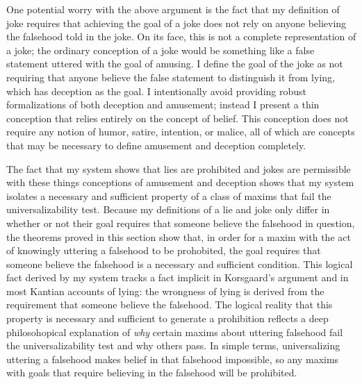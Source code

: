 \begin{isabellebody}
\endisatagproof
{\isafoldproof}%
%
\isadelimproof
%
\endisadelimproof
%
\begin{isamarkuptext}%
One potential worry with the above argument is the fact that my definition of joke requires that 
achieving the goal of a joke does not rely on anyone believing the falsehood told in the joke. On its face, 
this is not a complete representation of a joke; the ordinary conception of a joke would be something like 
a false statement uttered with the goal of amusing. I define the goal of the joke as not requiring that 
anyone believe the false statement to distinguish it from lying, which has deception as the goal. I 
intentionally avoid providing robust formalizations of both deception and amusement; instead I present a 
thin conception that relies entirely on the concept of belief. This conception does not require any notion
of humor, satire, intention, or malice, all of which are concepts that may be necessary to define 
amusement and deception completely. 

The fact that my system shows that lies are prohibited and jokes are permissible with these things 
conceptions of amusement and deception shows that my system isolates a necessary and sufficient property 
of a class of maxims that fail the universalizability test. Because my definitions of a lie and joke
only differ in whether or not their goal requires that someone believe the falsehood in question, the
theorems proved in this section show that, in order for a maxim with the act of knowingly uttering a falsehood
to be prohobited, the goal requires that someone believe the falsehood is a necessary and sufficient condition. 
This logical fact derived by my system tracks a fact implicit in Korsgaard's argument and in most Kantian accounts
of lying: the wrongness of lying is derived from the requirement that someone believe the falsehood. 
The logical reality that this property is necessary and sufficient to generate a prohibition reflects
a deep philosohopical explanation of \emph{why} certain maxims about uttering falsehood fail the universalizability
test and why others pass. In simple terms, universalizing uttering a falsehood makes belief in that 
falsehood impossible, so any maxims with goals that require believing in the falsehood will be prohibited.


\end{isamarkuptext}
\end{isabellebody}
